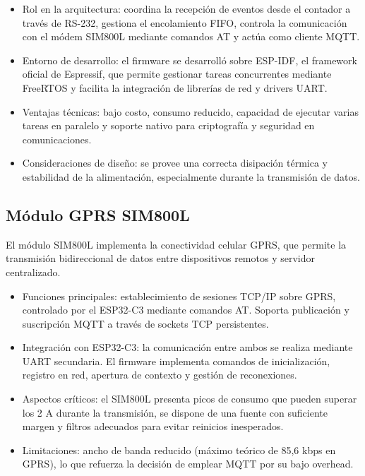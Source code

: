 \begin{itemize}

\item Rol en la arquitectura: coordina la recepción de eventos desde el contador a través de RS-232, gestiona el encolamiento FIFO, controla la comunicación con el módem SIM800L mediante comandos AT y actúa como cliente MQTT.

\item Entorno de desarrollo: el firmware se desarrolló sobre ESP-IDF, el framework oficial de Espressif, que permite gestionar tareas concurrentes mediante FreeRTOS y facilita la integración de librerías de red y drivers UART.

\item Ventajas técnicas: bajo costo, consumo reducido, capacidad de ejecutar varias tareas en paralelo y soporte nativo para criptografía y seguridad en comunicaciones.

\item Consideraciones de diseño: se provee una correcta disipación térmica y  estabilidad de la alimentación, especialmente durante la transmisión de datos.

\end{itemize}

\subsection{Módulo GPRS SIM800L}

El módulo SIM800L implementa la conectividad celular GPRS, que permite la transmisión bidireccional de datos entre dispositivos remotos y servidor centralizado.


\begin{itemize}

\item Funciones principales: establecimiento de sesiones TCP/IP sobre GPRS, controlado por el ESP32-C3 mediante comandos AT. Soporta publicación y suscripción MQTT a través de sockets TCP persistentes.

\item Integración con ESP32-C3: la comunicación entre ambos se realiza mediante UART secundaria. El firmware implementa comandos de inicialización, registro en red, apertura de contexto y gestión de reconexiones.

\item Aspectos críticos: el SIM800L presenta picos de consumo que pueden superar los 2 A durante la transmisión, se  dispone de una fuente con suficiente margen y filtros adecuados para evitar reinicios inesperados.

\item Limitaciones: ancho de banda reducido (máximo teórico de 85,6 kbps en GPRS), lo que refuerza la decisión de emplear MQTT por su bajo overhead.

\end{itemize}


